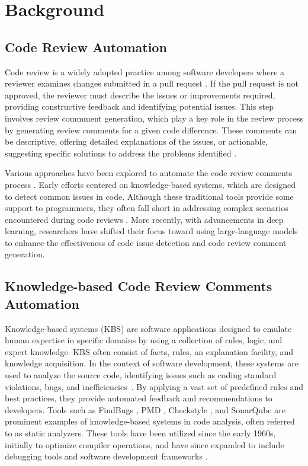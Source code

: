 \section{Background}
\label{sec:background}


\subsection{Code Review Automation}
Code review is a widely adopted practice among software developers where a reviewer examines changes submitted in a pull request \cite{hong2022commentfinder, ben2024improving, siow2020core}. If the pull request is not approved, the reviewer must describe the issues or improvements required, providing constructive feedback and identifying potential issues. This step involves review commment generation, which play a key role in the review process by generating review comments for a given code difference. These comments can be descriptive, offering detailed explanations of the issues, or actionable, suggesting specific solutions to address the problems identified \cite{ben2024improving}.


Various approaches have been explored to automate the code review comments process  \cite{tufano2023automating, tufano2024code, yang2024survey}. 
Early efforts centered on knowledge-based systems, which are designed to detect common issues in code. Although these traditional tools provide some support to programmers, they often fall short in addressing complex scenarios encountered during code reviews \cite{dehaerne2022code}. More recently, with advancements in deep learning, researchers have shifted their focus toward using large-language models to enhance the effectiveness of code issue detection and code review comment generation.

\subsection{Knowledge-based Code Review Comments Automation}

Knowledge-based systems (KBS) are software applications designed to emulate human expertise in specific domains by using a collection of rules, logic, and expert knowledge. KBS often consist of facts, rules, an explanation facility, and knowledge acquisition. In the context of software development, these systems are used to analyze the source code, identifying issues such as coding standard violations, bugs, and inefficiencies~\cite{singh2017evaluating, delaitre2015evaluating, ayewah2008using, habchi2018adopting}. By applying a vast set of predefined rules and best practices, they provide automated feedback and recommendations to developers. Tools such as FindBugs \cite{findBugs}, PMD \cite{pmd}, Checkstyle \cite{checkstyle}, and SonarQube \cite{sonarqube} are prominent examples of knowledge-based systems in code analysis, often referred to as static analyzers. These tools have been utilized since the early 1960s, initially to optimize compiler operations, and have since expanded to include debugging tools and software development frameworks \cite{stefanovic2020static, beller2016analyzing}.



